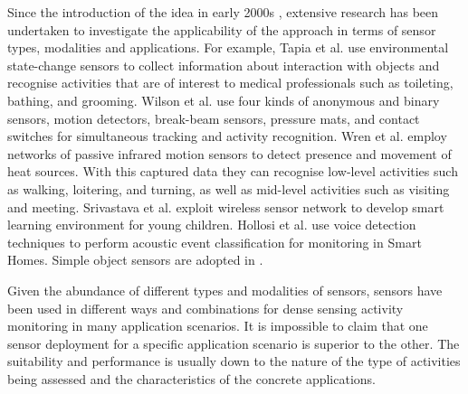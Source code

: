 Since the introduction of the idea in early 2000s \cite{Bao2004} \cite{Patterson2003}, extensive research has been undertaken to investigate the applicability of the approach in terms of sensor types, modalities and applications. For example, Tapia et al. \cite{Tapia2004} use environmental state-change sensors to collect information about interaction with objects and recognise activities that are of interest to medical professionals such as toileting, bathing, and grooming. Wilson et al. \cite{Wilson2005} use four kinds of anonymous and binary sensors, motion detectors, break-beam sensors, pressure mats, and contact switches for simultaneous tracking and activity recognition. Wren et al. \cite{Wren2006} employ networks of passive infrared motion sensors to detect presence and movement of heat sources. With this captured data they can recognise low-level activities such as walking, loitering, and turning, as well as mid-level activities such as visiting and meeting. Srivastava et al. \cite{Srivastava2001} exploit wireless sensor network to develop smart learning environment for young children. Hollosi et al. \cite{Hollosi2010} use voice detection techniques to perform acoustic event classification for monitoring in Smart Homes. Simple object sensors are adopted in \cite{Aipperspach2006}.

Given the abundance of different types and modalities of sensors, sensors have been used in different ways and combinations for dense sensing activity monitoring in many application scenarios. It is impossible to claim that one sensor deployment for a specific application scenario is superior to the other. The suitability and performance is usually down to the nature of the type of activities being assessed and the characteristics of the concrete applications. 

